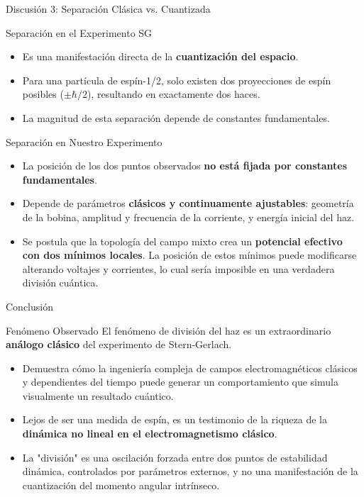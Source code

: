 \documentclass{beamer}
\begin{document}
\begin{frame}{Discusión 3: Separación Clásica vs. Cuantizada}
  \begin{block}{Separación en el Experimento SG}
    \begin{itemize}
      \item Es una manifestación directa de la \textbf{cuantización del espacio}.
      \item Para una partícula de espín-1/2, solo existen dos proyecciones de espín posibles ($\pm \hbar/2$), resultando en exactamente dos haces.
      \item La magnitud de esta separación depende de constantes fundamentales.
    \end{itemize}
  \end{block}

\end{frame}

\begin{frame}

  \begin{block}{Separación en Nuestro Experimento}
    \begin{itemize}
      \item La posición de los dos puntos observados \textbf{no está fijada por constantes fundamentales}.
      \item Depende de parámetros \textbf{clásicos y continuamente ajustables}: geometría de la bobina, amplitud y frecuencia de la corriente, y energía inicial del haz.
      \item Se postula que la topología del campo mixto crea un \textbf{potencial efectivo con dos mínimos locales}. La posición de estos mínimos puede modificarse alterando voltajes y corrientes, lo cual sería imposible en una verdadera división cuántica.
    \end{itemize}
  \end{block}
\end{frame}

\begin{frame}{Conclusión}
  \begin{alertblock}{Fenómeno Observado}
    El fenómeno de división del haz es un extraordinario \textbf{análogo clásico} del experimento de Stern-Gerlach.
  \end{alertblock}

  \begin{itemize}
    \item Demuestra cómo la ingeniería compleja de campos electromagnéticos clásicos y dependientes del tiempo puede generar un comportamiento que simula visualmente un resultado cuántico.
    \item Lejos de ser una medida de espín, es un testimonio de la riqueza de la \textbf{dinámica no lineal en el electromagnetismo clásico}.
    \item La "división" es una oscilación forzada entre dos puntos de estabilidad dinámica, controlados por parámetros externos, y no una manifestación de la cuantización del momento angular intrínseco.
  \end{itemize}
\end{frame}
\end{document}
